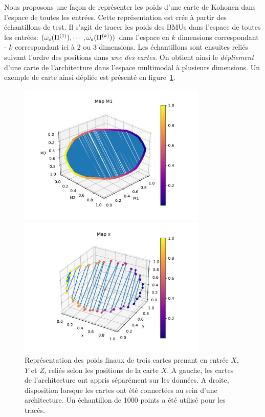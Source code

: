 Nous proposons une façon de représenter les poids d'une carte de Kohonen dans l'espace de toutes les entrées. Cette représentation est crée à partir des échantillons de test. Il s'agit de tracer les poids des BMUs dans l'espace de toutes les entrées: $(\omega_e(\Pi^{({1})}),\cdots,\omega_e(\Pi^{({k})}))$ dans l'espace en $k$ dimensions correspondant - $k$ correspondant ici à 2 ou 3 dimensions. Les échantillons sont ensuites reliés suivant l'ordre des positions dans \emph{une des cartes}. On obtient ainsi le \emph{dépliement} d'une carte de l'architecture dans l'espace multimodal à plusieurs dimensions. Un exemple de carte ainsi dépliée est présenté en figure~\ref{fig:distortion}.
\begin{figure}
\begin{minipage}{0.5\textwidth}
\centering\includegraphics[width=0.8\textwidth]{unco3som}
\end{minipage}
\begin{minipage}{0.5\textwidth}
\centering\includegraphics[width=0.8\textwidth]{disto_Mx}
\end{minipage}
\caption{Représentation des poids finaux de trois cartes prenant en entrée $X$,$Y$ et $Z$, reliés selon les positions de la carte $X$. A gauche, les cartes de l'architecture ont appris séparément sur les données. A droite, disposition lorsque les cartes ont été connectées au sein d'une architecture. Un échantillon de 1000 points a été utilisé pour les tracés.}
\label{fig:distortion}
\end{figure}

